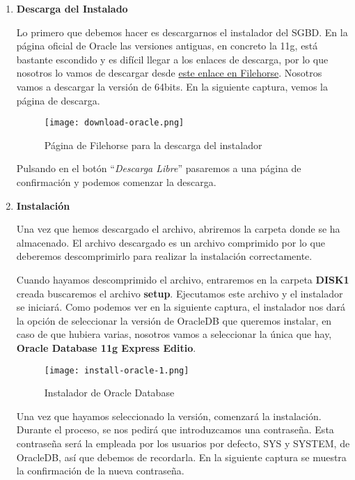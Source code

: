 \begin{enumerate}
    \item \textbf{Descarga del Instalado}

    Lo primero que debemos hacer es descargarnos el instalador del SGBD. En la página oficial de Oracle las versiones antiguas, en concreto la 11g, está bastante escondido y es difícil llegar a los enlaces de descarga, por lo que nosotros lo vamos de descargar desde \href{https://www.filehorse.com/es/descargar-oracle-database-express/}{este enlace en Filehorse}. Nosotros vamos a descargar la versión de 64bits. En la siguiente captura, vemos la página de descarga.

    \begin{figure}[ht]
        \centering
        \texttt{[image: download-oracle.png]}
        \caption{Página de Filehorse para la descarga del instalador}
    \end{figure}

    Pulsando en el botón ``\textit{Descarga Libre}'' pasaremos a una página de confirmación y podemos comenzar la descarga.

    \item \textbf{Instalación}

    Una vez que hemos descargado el archivo, abriremos la carpeta donde se ha almacenado. El archivo descargado es un archivo comprimido por lo que deberemos descomprimirlo para realizar la instalación correctamente.

    Cuando hayamos descomprimido el archivo, entraremos en la carpeta \textbf{DISK1} creada buscaremos el archivo \textbf{setup}. Ejecutamos este archivo y el instalador se iniciará. Como podemos ver en la siguiente captura, el instalador nos dará la opción de seleccionar la versión de OracleDB que queremos instalar, en caso de que hubiera varias, nosotros vamos a seleccionar la única que hay, \textbf{Oracle Database 11g Express Editio}.

    \newpage

    \begin{figure}[ht]
        \centering
        \texttt{[image: install-oracle-1.png]}
        \caption{Instalador de Oracle Database}
    \end{figure}

    Una vez que hayamos seleccionado la versión, comenzará la instalación. Durante el proceso, se nos pedirá que introduzcamos una contraseña. Esta contraseña será la empleada por los usuarios por defecto, SYS y SYSTEM, de OracleDB, así que debemos de recordarla. En la siguiente captura se muestra la confirmación de la nueva contraseña.


\end{enumerate}
